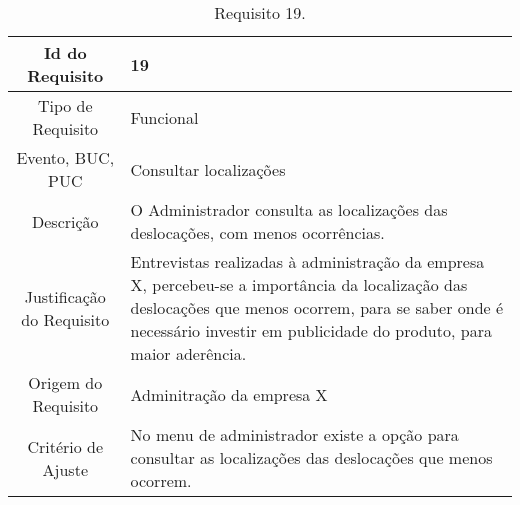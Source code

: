 \begin{table}[H]
\begin{center}
  \begin{tabularx}{\textwidth}{ | c | X | }
    \hline
    Id do Requisito & 19  \\
    
    \hline
    Tipo de Requisito & Funcional \\
    
    \hline
    Evento, BUC, PUC &  Consultar localizações\\
    
    \hline
    Descrição & O Administrador consulta as localizações das deslocações, com menos ocorrências.\\
    
    \hline
    Justificação do Requisito & Entrevistas realizadas à administração da empresa X, percebeu-se a importância da localização das deslocações que menos ocorrem, para se saber onde é necessário investir em publicidade do produto, para maior aderência. \\
    
    \hline
    Origem do Requisito & Adminitração da empresa X\\
    
    \hline
    Critério de Ajuste & No menu de administrador existe a opção para consultar as localizações das deslocações que menos ocorrem.  \\
    
    \hline
  \end{tabularx}
  \caption{Requisito 19.} \label{tab:r3}
\end{center}
\end{table}


